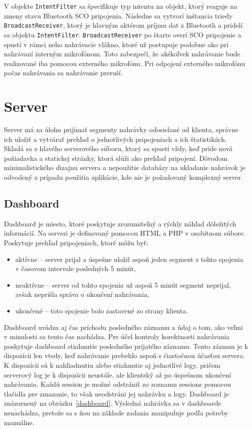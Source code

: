 V objekte \texttt{IntentFilter} sa špecifikuje typ intentu na objekt, ktorý reaguje na zmeny stavu Bluetooth SCO pripojenia. Následne sa vytvorí inštancia triedy \texttt{BroadcastReceiver}, ktorý je hlavným aktérom príjmu dat z Bluetooth a pridelí sa objektu \texttt{IntentFilter}. \texttt{BroadcastReceiver} po štarte overí SCO pripojenie a spustí v rámci neho nahrávacie vlákno, ktoré už postupuje podobne ako pri nahrávaní interným mikrofónom. Toto zabezpečí, že akékoľvek nahrávanie bude realizované iba pomocou externého mikrofónu. Pri odpojení externého mikrofónu počas nahrávania sa nahrávanie preruší.


\section{Server}

Server má za úlohu prijímať segmenty nahrávky odosielané od klienta, správne ich uložiť a vytvárať prehľad o jednotlivých pripojeniach a ich štatistikách. Skladá sa z hlavého serverového súboru, ktorý sa spustí vždy, keď príde nová požiadavka a statickej stránky, ktorá slúži ako prehľad pripojení. Dôvodom minimalistického dizajnu servera a nepoužitie databázy na ukladanie nahrávok je odvodený z prípadu použitia aplikácie, kde nie je požadovaný komplexný server. 


\subsection*{Dashboard}

Dashboard je miesto, ktoré poskytuje zrozumiteľný a rýchly náhľad dôležitých informácií. Na serveri je definovaný pomocou HTML a PHP v osobitnom súbore. Poskytuje prehľad pripojeniach, ktoré môžu byť:
\begin{itemize}
  \item{aktívne -- server prijal a úspešne uložil aspoň jeden segment z tohto spojenia v časovom intervale posledných 5 minút,}
  \item{neaktívne -- server od tohto spojenia už aspoň 5 minút segment neprijal, avšak neprišla správa o ukončení nahrávania,}
  \item{ukončené -- toto spojenie bolo zastavené zo strany klienta.}
\end{itemize}
Dashboard uvádza aj čas príchodu posledného záznamu a údaj o tom, ako veľmi v minulosti sa tento čas nachádza. Pre účel kontroly korektnosti nahrávania poskytuje dashboard stiahnutie posledného prijatého záznamu. Tento záznam je k dispozícii len vtedy, keď nahrávanie prebehlo aspoň s čiastočnou účasťou servera. K dispozícii sú k nahliadnutiu alebo stiahnutie aj jednotlivé logy, pričom serverový log je k dispozícii neustále, ale klientský až po úspešnom ukončení nahrávania. Každú session je možné odstrániť zo zoznamu sessions pomocou tlačidla pre zmazanie, to však neodstráni jej nahrávku a logy. Dashboard je znázornený na obrázku~\ref{dashboard}. Výsledná nahrávka sa v dashboarde nenachádza, pretože sa s ňou na základe zadania manipuluje podľa potreby manuálne.

